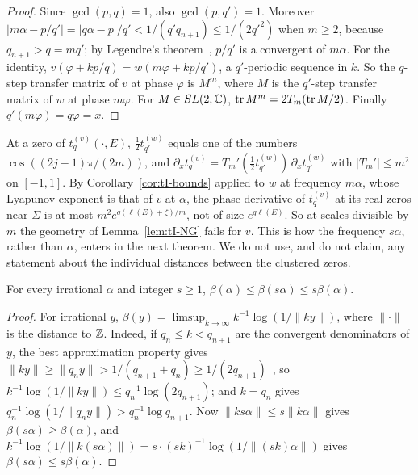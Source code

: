\begin{proof}
Since $\gcd(p,q)=1$, also $\gcd(p,q')=1$. Moreover $|m\alpha-p/q'|=|q\alpha-p|/q'<1/(q'q_{n+1})\le1/(2q'^2)$ when $m\ge2$, because $q_{n+1}>q=mq'$; by Legendre's theorem~\cite[Chapter~II]{Khinchin1964}, $p/q'$ is a convergent of $m\alpha$. For the identity, $v(\varphi+kp/q)=w(m\varphi+kp/q')$, a $q'$-periodic sequence in $k$. So the $q$-step transfer matrix of $v$ at phase $\varphi$ is $M^m$, where $M$ is the $q'$-step transfer matrix of $w$ at phase $m\varphi$. For $M\in SL(2,\mathbb C)$, $\operatorname{tr} M^m=2T_m(\operatorname{tr} M/2)$. Finally $q'(m\varphi)=q\varphi=x$.
\end{proof}

At a zero of $t^{(v)}_q(\cdot,E)$, $\frac12t^{(w)}_{q'}$ equals one of the numbers $\cos((2j-1)\pi/(2m))$, and $\partial_xt^{(v)}_q=T_m'(\frac12t^{(w)}_{q'})\,\partial_xt^{(w)}_{q'}$ with $|T_m'|\le m^2$ on $[-1,1]$. By Corollary~\ref{cor:tI-bounds} applied to $w$ at frequency $m\alpha$, whose Lyapunov exponent is that of $v$ at $\alpha$, the phase derivative of $t^{(v)}_q$ at its real zeros near $\Sigma$ is at most $m^2e^{q(\ell(E)+\zeta)/m}$, not of size $e^{q\ell(E)}$. So at scales divisible by $m$ the geometry of Lemma~\ref{lem:tI-NG} fails for $v$. This is how the frequency $s\alpha$, rather than $\alpha$, enters in the next theorem. We do not use, and do not claim, any statement about the individual distances between the clustered zeros.

\begin{lemma}\label{lem:tI-betas}
For every irrational $\alpha$ and integer $s\ge1$, $\beta(\alpha)\le\beta(s\alpha)\le s\beta(\alpha)$.
\end{lemma}

\begin{proof}
For irrational $y$, $\beta(y)=\limsup_{k\to\infty}k^{-1}\log(1/\|ky\|)$, where $\|\cdot\|$ is the distance to $\mathbb Z$. Indeed, if $q_n\le k<q_{n+1}$ are the convergent denominators of $y$, the best approximation property gives $\|ky\|\ge\|q_ny\|>1/(q_{n+1}+q_n)\ge1/(2q_{n+1})$~\cite[Chapter~II]{Khinchin1964}, so $k^{-1}\log(1/\|ky\|)\le q_n^{-1}\log(2q_{n+1})$; and $k=q_n$ gives $q_n^{-1}\log(1/\|q_ny\|)>q_n^{-1}\log q_{n+1}$. Now $\|ks\alpha\|\le s\|k\alpha\|$ gives $\beta(s\alpha)\ge\beta(\alpha)$, and $k^{-1}\log(1/\|k(s\alpha)\|)=s\cdot(sk)^{-1}\log(1/\|(sk)\alpha\|)$ gives $\beta(s\alpha)\le s\beta(\alpha)$.
\end{proof}


